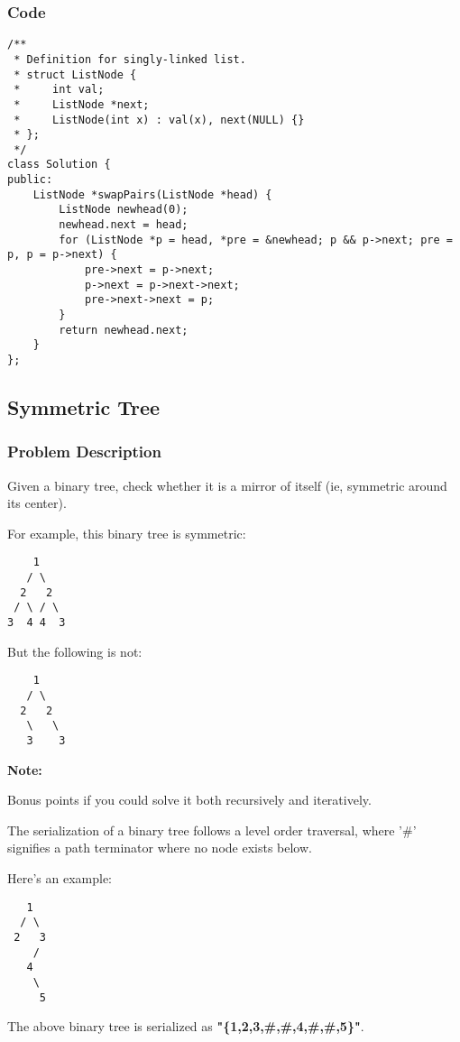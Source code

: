 \documentclass{article}
\begin{document}
\begin{CJK*}{UTF8}{gkai}
\subsubsection*{Code}
\begin{lstlisting}
/**
 * Definition for singly-linked list.
 * struct ListNode {
 *     int val;
 *     ListNode *next;
 *     ListNode(int x) : val(x), next(NULL) {}
 * };
 */
class Solution {
public:
    ListNode *swapPairs(ListNode *head) {
        ListNode newhead(0);
        newhead.next = head;
        for (ListNode *p = head, *pre = &newhead; p && p->next; pre = p, p = p->next) {
            pre->next = p->next;
            p->next = p->next->next;
            pre->next->next = p;
        }
        return newhead.next;
    }
}; 
\end{lstlisting}


\subsection{ Symmetric Tree }
\label{ Symmetric Tree }

\subsubsection*{Problem Description}
Given a binary tree, check whether it is a mirror of itself (ie, symmetric around its center).

For example, this binary tree is symmetric:
\begin{verbatim}
    1
   / \
  2   2
 / \ / \
3  4 4  3
\end{verbatim}

But the following is not:


\begin{verbatim}
    1
   / \
  2   2
   \   \
   3    3
\end{verbatim}

\textbf{Note:}


Bonus points if you could solve it both recursively and iteratively.

The serialization of a binary tree follows a level order traversal, where '\#' signifies a path terminator where no node exists below.

Here's an example:


\begin{verbatim}
   1
  / \
 2   3
    /
   4
    \
     5
\end{verbatim}
The above binary tree is serialized as \textbf{"\{1,2,3,\#,\#,4,\#,\#,5\}"}.



\end{CJK*}
\end{document}
